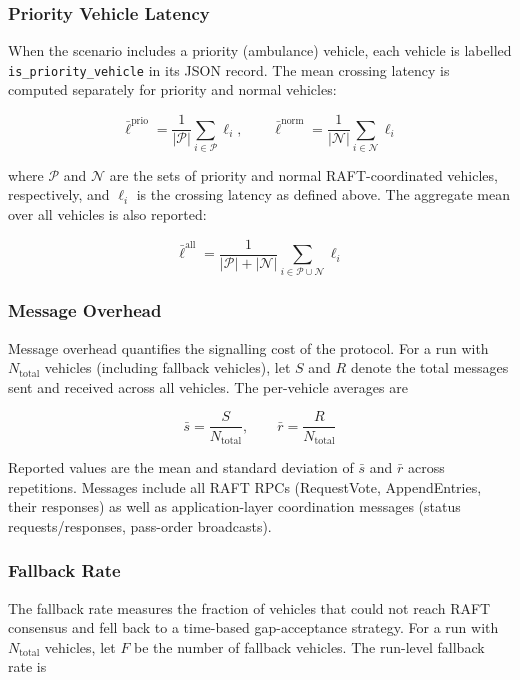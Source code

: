 \documentclass[fleqn,10pt]{olplainarticle}
\begin{document}
\subsubsection{Priority Vehicle Latency}

When the scenario includes a priority (ambulance) vehicle, each vehicle is
labelled \texttt{is\_priority\_vehicle} in its JSON record. The mean crossing
latency is computed separately for priority and normal vehicles:

\[
  \bar{\ell}^{\mathrm{prio}} = \frac{1}{|\mathcal{P}|} \sum_{i \in \mathcal{P}} \ell_i,
  \qquad
  \bar{\ell}^{\mathrm{norm}} = \frac{1}{|\mathcal{N}|} \sum_{i \in \mathcal{N}} \ell_i
\]

where $\mathcal{P}$ and $\mathcal{N}$ are the sets of priority and normal
RAFT-coordinated vehicles, respectively, and $\ell_i$ is the crossing latency as
defined above. The aggregate mean over all vehicles is also reported:

\[
  \bar{\ell}^{\mathrm{all}} = \frac{1}{|\mathcal{P}| + |\mathcal{N}|}
    \sum_{i \in \mathcal{P} \cup \mathcal{N}} \ell_i
\]

\subsubsection{Message Overhead}

Message overhead quantifies the signalling cost of the protocol. For a run with
$N_{\mathrm{total}}$ vehicles (including fallback vehicles), let $S$ and $R$
denote the total messages sent and received across all vehicles. The per-vehicle
averages are

\[
  \bar{s} = \frac{S}{N_{\mathrm{total}}}, \qquad
  \bar{r} = \frac{R}{N_{\mathrm{total}}}
\]

Reported values are the mean and standard deviation of $\bar{s}$ and $\bar{r}$
across repetitions. Messages include all RAFT RPCs (RequestVote, AppendEntries,
their responses) as well as application-layer coordination messages
(status requests/responses, pass-order broadcasts).

\subsubsection{Fallback Rate}

The fallback rate measures the fraction of vehicles that could not reach RAFT
consensus and fell back to a time-based gap-acceptance strategy. For a run with
$N_{\mathrm{total}}$ vehicles, let $F$ be the number of fallback vehicles. The
run-level fallback rate is
\end{document}
